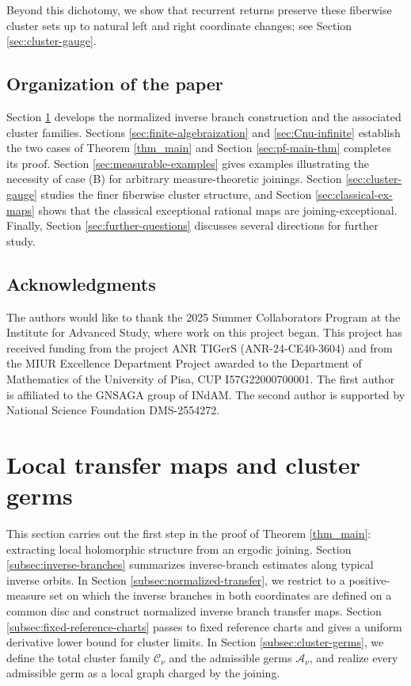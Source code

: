 \documentclass[11pt]{amsart}
\numberwithin{equation}{section}
\theoremstyle{plain}
\theoremstyle{definition}
\theoremstyle{remark}
\begin{document}
\smallskip

Beyond this dichotomy,
we show that recurrent returns preserve these
fiberwise cluster sets up to natural left and right coordinate changes; see Section 
\ref{sec:cluster-gauge}.


\subsection{Organization of the paper}
Section \ref{sec:transfer-cluster} develops the normalized inverse
branch construction and the associated cluster families. Sections
\ref{sec:finite-algebraization} and \ref{sec:Cnu-infinite} establish the
two cases of Theorem \ref{thm_main} and Section \ref{sec:pf-main-thm} completes its proof.
Section \ref{sec:measurable-examples} gives examples illustrating the
necessity of case \textup{(B)} for arbitrary
measure-theoretic joinings.
Section
\ref{sec:cluster-gauge} studies the finer fiberwise cluster structure,
and Section \ref{sec:classical-ex-maps} shows that the classical
exceptional rational maps are joining-exceptional. Finally, Section
\ref{sec:further-questions} discusses several directions for further
study.


\subsection*{Acknowledgments}
The authors would like to thank the 2025 Summer Collaborators Program at the Institute for Advanced Study, where work on this project began.
This project has received funding from the
project ANR TIGerS (ANR-24-CE40-3604)
and from the MIUR Excellence Department Project awarded to the
Department of Mathematics of the University of Pisa,
CUP I57G22000700001.
The first author is affiliated to the GNSAGA group of INdAM. The second author is supported by National Science Foundation DMS-2554272.


\section{Local transfer maps and cluster germs}
\label{sec:transfer-cluster}
This section carries out the first step in the proof of
Theorem \ref{thm_main}: extracting local holomorphic structure from
an ergodic joining.
Section \ref{subsec:inverse-branches} 
summarizes
inverse-branch estimates
along typical inverse orbits. In Section \ref{subsec:normalized-transfer},
we restrict to a positive-measure set on which the inverse branches in
both coordinates are defined on a common disc and construct normalized
inverse branch transfer maps. Section
\ref{subsec:fixed-reference-charts} passes to fixed reference charts
and gives a uniform derivative lower bound for cluster limits. In
Section \ref{subsec:cluster-germs}, we define the total cluster family
$\mathcal C_\nu$ and the admissible germs $\mathcal A_\nu$, and
realize every admissible germ as a local graph charged by the joining.
\end{document}

